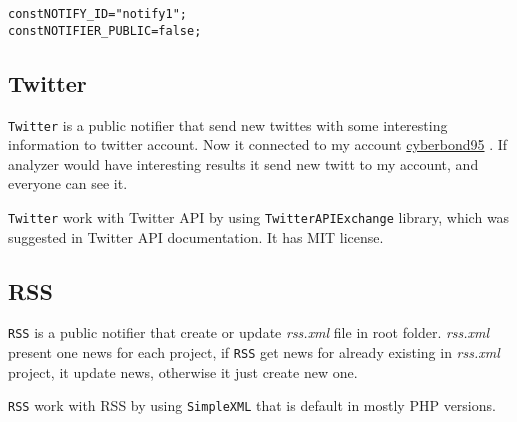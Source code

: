\begin{alltt}
const NOTIFY_ID = "notify1";
const NOTIFIER_PUBLIC = false;
\end{alltt}

\subsection{Twitter}

\texttt{Twitter} is a public notifier that send new twittes with some interesting information to twitter account. Now it connected to my account \href{https://twitter.com/cyberbond95}{cyberbond95} . If analyzer would have interesting results it send new twitt to my account, and everyone can see it.

\texttt{Twitter} work with Twitter API by using \texttt{TwitterAPIExchange} library, which was suggested in Twitter API documentation. It has MIT license.

\subsection{RSS}

\texttt{RSS} is a public notifier that create or update \emph{rss.xml} file in root folder. \emph{rss.xml} present one news for each project, if \texttt{RSS} get news for already existing in \emph{rss.xml} project, it update news, otherwise it just create new one.

\texttt{RSS} work with RSS by using \texttt{SimpleXML} that is default in mostly PHP versions.
